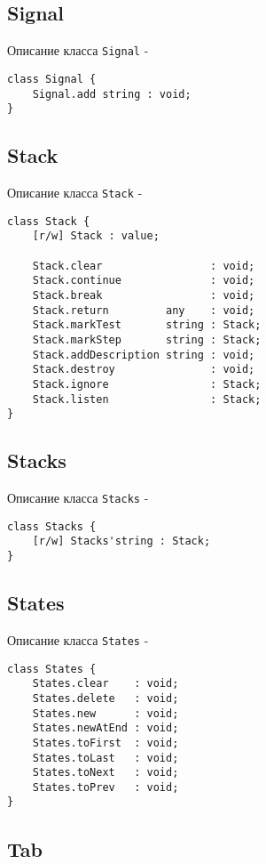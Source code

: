 \subsection{{\color{orange} Signal}}

\noindent Описание класса \texttt{Signal} -
\begin{verbatim}
class Signal {
    Signal.add string : void;
}
\end{verbatim}

\subsection{{\color{orange} Stack}}

\noindent Описание класса \texttt{Stack} -
\begin{verbatim}
class Stack {
    [r/w] Stack : value;
	
    Stack.clear                 : void;
	Stack.continue              : void;
	Stack.break                 : void;
	Stack.return         any    : void;
	Stack.markTest       string : Stack;
	Stack.markStep       string : Stack;
	Stack.addDescription string : void;
	Stack.destroy               : void;
	Stack.ignore                : Stack;
	Stack.listen                : Stack;
}
\end{verbatim}

\subsection{{\color{orange} Stacks}}

\noindent Описание класса \texttt{Stacks} -
\begin{verbatim}
class Stacks {
    [r/w] Stacks'string : Stack;
}
\end{verbatim}

\subsection{{\color{orange} States}}

\noindent Описание класса \texttt{States} -
\begin{verbatim}
class States {
    States.clear    : void;
	States.delete   : void;
	States.new      : void;
	States.newAtEnd : void;
	States.toFirst  : void;
	States.toLast   : void;
	States.toNext   : void;
	States.toPrev   : void;
}
\end{verbatim}

\subsection{{\color{orange} Tab}}


